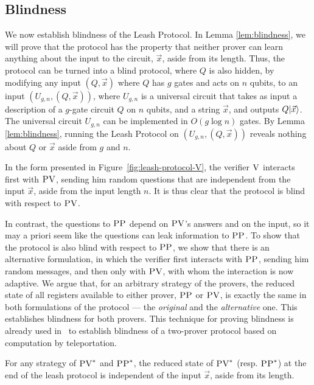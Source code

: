 \subsection{Blindness}
\label{sec:leash-blind}

We now establish blindness of the Leash Protocol. In Lemma \ref{lem:blindness}, we will prove that the protocol has the property that neither prover can learn anything about the input to the circuit, $\vec{x}$, aside from its length. Thus, the protocol can be turned into a blind protocol, where $Q$ is also hidden, by modifying any input $(Q,\vec{x})$ where $Q$ has $g$ gates and acts on $n$ qubits, to an input $(U_{g,n},(Q,\vec{x}))$, where $U_{g,n}$ is a universal circuit that takes as input a description of a $g$-gate circuit $Q$ on $n$ qubits, and a string $\vec{x}$, and outputs $Q|\vec{x}\rangle$. The universal circuit $U_{g,n}$ can be implemented in $O(g\log n)$ gates. By Lemma \ref{lem:blindness}, running the Leash Protocol on $(U_{g,n},(Q,\vec{x}))$ reveals nothing about $Q$ or $\vec{x}$ aside from $g$ and $n$.

In the form presented in Figure~\ref{fig:leash-protocol-V}, the verifier $\textsc{V}$ interacts first with $\textsc{PV}$, sending him random questions that are independent from the input $\vec{x}$, aside from the input length $n$. It is thus clear that the protocol is blind with respect to $\textsc{PV}$. 

In contrast, the questions to $\textsc{PP}$ depend on $\textsc{PV}$'s answers and on the input, so it may a priori seem like the questions can leak information to $\textsc{PP}$. To show that the protocol is also blind with respect to $\textsc{PP}$, we show that there is an alternative formulation, in which the verifier first interacts with $\textsc{PP}$, sending him random messages, and then only with $\textsc{PV}$, with whom the interaction is now adaptive. We argue that, for an arbitrary strategy of the provers, the reduced state of all registers available to either prover, $\textsc{PP}$ or $\textsc{PV}$, is exactly the same in both formulations of the protocol --- the \emph{original} and the \emph{alternative} one. This establishes blindness for both provers. This technique for proving blindness is already used in~\cite{reichardt2012classical} to establish blindness of a two-prover protocol based on computation by teleportation. 


\begin{lemma}\label{lem:blindness}
For any strategy of $\textsc{PV}^*$ and $\textsc{PP}^*$, the reduced state of $\textsc{PV}^*$ (resp. $\textsc{PP}^*$) at the end of the leash protocol
is independent of the input $\vec{x}$, aside from its length.
\end{lemma}

